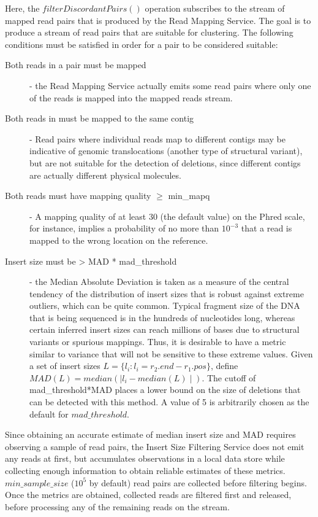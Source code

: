 Here, the $filterDiscordantPairs()$ operation subscribes to the stream of mapped read pairs that is produced by the Read Mapping Service. The goal is to produce a stream of read pairs that are suitable for clustering. The following conditions must be satisfied in order for a pair to be considered suitable:

\begin{description}
    \item [Both reads in a pair must be mapped] - the Read Mapping Service actually emits some read pairs where only one of the reads is mapped into the mapped reads stream.
    \item [Both reads in must be mapped to the same contig] - Read pairs where individual reads map to different contigs may be indicative of genomic translocations (another type of structural variant), but are not suitable for the detection of deletions, since different contigs are actually different physical molecules.
    \item [Both reads must have mapping quality $\ge$ min\_mapq] - A mapping quality of at least 30 (the default value) on the Phred scale, for instance, implies a probability of no more than $10^{-3}$ that a read is mapped to the wrong location on the reference.
    \item [Insert size must be > MAD * mad\_threshold] - the Median Absolute Deviation is taken as a measure of the central tendency of the distribution of insert sizes that is robust against extreme outliers, which can be quite common. Typical fragment size of the DNA that is being sequenced is in the hundreds of nucleotides long, whereas certain inferred insert sizes can reach millions of bases due to structural variants or spurious mappings. Thus, it is desirable to have a metric similar to variance that will not be sensitive to these extreme values. Given a set of insert sizes $L = \{l_i: l_i=r_2.end-r_1.pos \}$, define $MAD(L) = median(\mid l_i - median(L)\mid)$. The cutoff of mad\_threshold*MAD places a lower bound on the size of deletions that can be detected with this method. A value of 5 is arbitrarily chosen as the default for $mad\_threshold$.
\end{description}

Since obtaining an accurate estimate of median insert size and MAD requires observing a sample of read pairs, the Insert Size Filtering Service does not emit any reads at first, but accumulates observations in a local data store while collecting enough information to obtain reliable estimates of these metrics. $min\_sample\_size$ ($10^5$ by default) read pairs are collected before filtering begins. Once the metrics are obtained, collected reads are filtered first and released, before processing any of the remaining reads on the stream.

